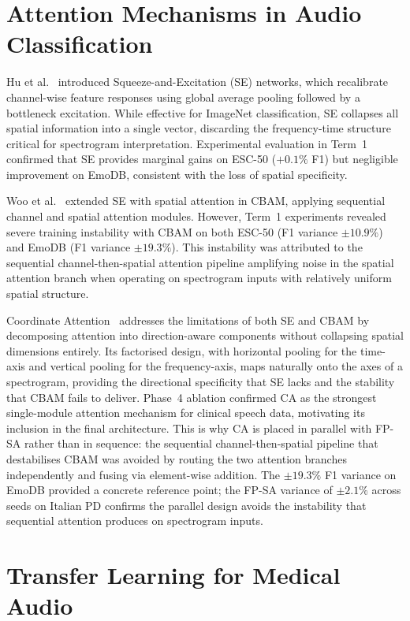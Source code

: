 \documentclass[oneside,openany]{final_report}
\begin{document}
\section{Attention Mechanisms in Audio Classification}

Hu et al.~\cite{hu2018} introduced Squeeze-and-Excitation (SE) networks, which recalibrate channel-wise feature responses using global average pooling followed by a bottleneck excitation. While effective for ImageNet classification, SE collapses all spatial information into a single vector, discarding the frequency-time structure critical for spectrogram interpretation. Experimental evaluation in Term~1 confirmed that SE provides marginal gains on ESC-50 ($+0.1\%$ F1) but negligible improvement on EmoDB, consistent with the loss of spatial specificity.

Woo et al.~\cite{woo2018} extended SE with spatial attention in CBAM, applying sequential channel and spatial attention modules. However, Term~1 experiments revealed severe training instability with CBAM on both ESC-50 (F1 variance $\pm 10.9\%$) and EmoDB (F1 variance $\pm 19.3\%$). This instability was attributed to the sequential channel-then-spatial attention pipeline amplifying noise in the spatial attention branch when operating on spectrogram inputs with relatively uniform spatial structure.

Coordinate Attention~\cite{hou2021} addresses the limitations of both SE and CBAM by decomposing attention into direction-aware components without collapsing spatial dimensions entirely. Its factorised design, with horizontal pooling for the time-axis and vertical pooling for the frequency-axis, maps naturally onto the axes of a spectrogram, providing the directional specificity that SE lacks and the stability that CBAM fails to deliver. Phase~4 ablation confirmed CA as the strongest single-module attention mechanism for clinical speech data, motivating its inclusion in the final architecture. This is why CA is placed in parallel with FP-SA rather than in sequence: the sequential channel-then-spatial pipeline that destabilises CBAM was avoided by routing the two attention branches independently and fusing via element-wise addition. The $\pm 19.3\%$ F1 variance on EmoDB provided a concrete reference point; the FP-SA variance of $\pm 2.1\%$ across seeds on Italian PD confirms the parallel design avoids the instability that sequential attention produces on spectrogram inputs.

\section{Transfer Learning for Medical Audio}
\end{document}
